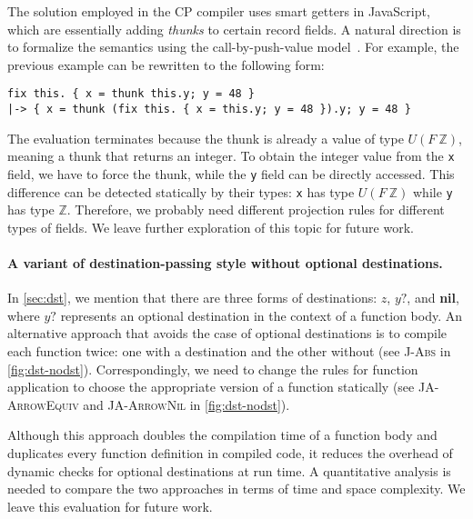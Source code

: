 The solution employed in the CP compiler uses smart getters in JavaScript, which
are essentially adding \emph{thunks} to certain record fields. A natural
direction is to formalize the semantics using the call-by-push-value
model~\citep{levy2012call}. For example, the previous example can be rewritten
to the following form:
\begin{lstlisting}[morekeywords=thunk]
    fix this. { x = thunk this.y; y = 48 }
|-> { x = thunk (fix this. { x = this.y; y = 48 }).y; y = 48 }
\end{lstlisting}
The evaluation terminates because the thunk is already a value of type $U (F\
\mathbb{Z})$, meaning a thunk that returns an integer. To obtain the integer
value from the \lstinline{x} field, we have to force the thunk, while the
\lstinline{y} field can be directly accessed. This difference can be detected
statically by their types: \lstinline{x} has type $U (F\ \mathbb{Z})$ while
\lstinline{y} has type $\mathbb{Z}$. Therefore, we probably need different
projection rules for different types of fields. We leave further exploration of
this topic for future work.

\paragraph{A variant of destination-passing style without optional destinations.}
In \autoref{sec:dst}, we mention that there are three forms of destinations:
$z$, $y?$, and \textbf{nil}, where $y?$ represents an optional destination in
the context of a function body. An alternative approach that avoids the case of
optional destinations is to compile each function twice: one with a destination
and the other without (see \textsc{J-Abs} in \autoref{fig:dst-nodst}).
Correspondingly, we need to change the rules for function application to choose
the appropriate version of a function statically (see \textsc{JA-ArrowEquiv} and
\textsc{JA-ArrowNil} in \autoref{fig:dst-nodst}).

Although this approach doubles the compilation time of a function body and
duplicates every function definition in compiled code, it reduces the overhead
of dynamic checks for optional destinations at run time. A quantitative analysis
is needed to compare the two approaches in terms of time and space complexity.
We leave this evaluation for future work.

